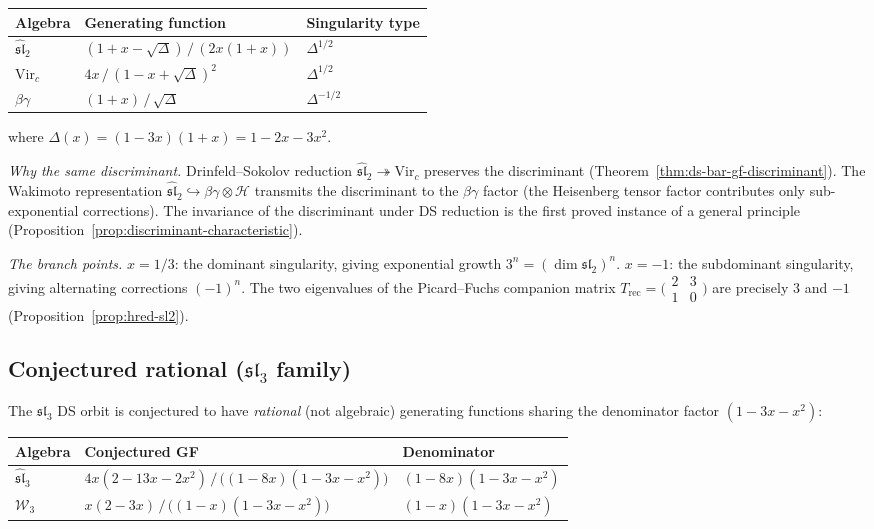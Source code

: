 \begin{center}
\renewcommand{\arraystretch}{1.4}
\begin{tabular}{lll}
\toprule
\textbf{Algebra} & \textbf{Generating function} & \textbf{Singularity type} \\
\midrule
$\widehat{\mathfrak{sl}}_2$ & $(1+x-\sqrt{\Delta})\,/\,(2x(1+x))$ & $\Delta^{1/2}$ \\
$\mathrm{Vir}_c$ & $4x\,/\,(1-x+\sqrt{\Delta})^2$ & $\Delta^{1/2}$ \\
$\beta\gamma$ & $(1+x)\,/\,\sqrt{\Delta}$ & $\Delta^{-1/2}$ \\
\bottomrule
\end{tabular}
\end{center}
where $\Delta(x) = (1-3x)(1+x) = 1-2x-3x^2$.

\emph{Why the same discriminant.}
Drinfeld--Sokolov reduction $\widehat{\mathfrak{sl}}_2 \twoheadrightarrow \mathrm{Vir}_c$ preserves the discriminant (Theorem~\ref{thm:ds-bar-gf-discriminant}). The Wakimoto representation $\widehat{\mathfrak{sl}}_2 \hookrightarrow \beta\gamma \otimes \mathcal{H}$ transmits the discriminant to the $\beta\gamma$ factor (the Heisenberg tensor factor contributes only sub-exponential corrections). The invariance of the discriminant under DS reduction is the first proved instance of a general principle (Proposition~\ref{prop:discriminant-characteristic}).

\emph{The branch points.}
$x = 1/3$: the dominant singularity, giving exponential growth $3^n = (\dim\mathfrak{sl}_2)^n$. $x = -1$: the subdominant singularity, giving alternating corrections $(-1)^n$. The two eigenvalues of the Picard--Fuchs companion matrix $T_{\mathrm{rec}} = \bigl(\begin{smallmatrix} 2 & 3 \\ 1 & 0 \end{smallmatrix}\bigr)$ are precisely $3$ and $-1$ (Proposition~\ref{prop:hred-sl2}).

\subsection{Conjectured rational ($\mathfrak{sl}_3$ family)}
\label{subsec:gf-sl3-family}

The $\mathfrak{sl}_3$ DS orbit is conjectured to have \emph{rational} (not algebraic) generating functions sharing the denominator factor $(1-3x-x^2)$:

\begin{center}
\renewcommand{\arraystretch}{1.4}
\begin{tabular}{lll}
\toprule
\textbf{Algebra} & \textbf{Conjectured GF} & \textbf{Denominator} \\
\midrule
$\widehat{\mathfrak{sl}}_3$ & $4x(2-13x-2x^2)\,/\,\bigl((1-8x)(1-3x-x^2)\bigr)$ & $(1-8x)(1-3x-x^2)$ \\
$\mathcal{W}_3$ & $x(2-3x)\,/\,\bigl((1-x)(1-3x-x^2)\bigr)$ & $(1-x)(1-3x-x^2)$ \\
\bottomrule
\end{tabular}
\end{center}

